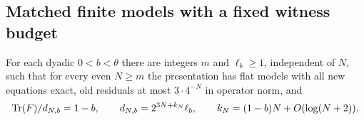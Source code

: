 \subsection{Matched finite models with a fixed witness budget}\label{sec:stop-models}
\begin{lemma}\label{lem:limit-finite}
For each dyadic $0<b<\theta$ there are integers $m$ and $\ell_b\ge1$, independent of $N$, such that for every even $N\ge m$ the presentation has flat models with all new equations exact, old residuals at most $3\cdot4^{-N}$ in operator norm, and
\begin{equation}\label{eq:fixed-threshold-dimension}
 \operatorname{Tr}(F)/d_{N,b}=1-b,\qquad
 d_{N,b}=2^{3N+k_N}\ell_b,\qquad
 k_N=(1-b)N+O(\log(N+2)).
\end{equation}
\end{lemma}

